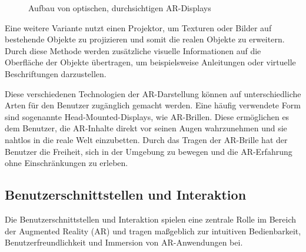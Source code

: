 \begin{figure}[h]
      \centering
      
      \caption[width=0.7\columnwidth]{Aufbau von optischen, durchsichtigen AR-Displays \cite{billinghurst2015survey}}
      \label{fig:OSTAR}
\end{figure}

Eine weitere Variante nutzt einen Projektor, um Texturen oder Bilder auf
bestehende Objekte zu projizieren und somit die realen Objekte zu erweitern.
Durch diese Methode werden zusätzliche visuelle Informationen auf die
Oberfläche der Objekte übertragen, um beispielsweise Anleitungen oder virtuelle
Beschriftungen darzustellen.

Diese verschiedenen Technologien der AR-Darstellung können auf unterschiedliche
Arten für den Benutzer zugänglich gemacht werden. Eine häufig verwendete Form
sind sogenannte Head-Mounted-Displays, wie AR-Brillen. Diese ermöglichen es dem
Benutzer, die AR-Inhalte direkt vor seinen Augen wahrzunehmen und sie nahtlos
in die reale Welt einzubetten. Durch das Tragen der AR-Brille hat der Benutzer
die Freiheit, sich in der Umgebung zu bewegen und die AR-Erfahrung ohne
Einschränkungen zu erleben. \cite{billinghurst2015survey}

\subsection{Benutzerschnittstellen und Interaktion}
Die Benutzerschnittstellen und Interaktion spielen eine zentrale Rolle im
Bereich der Augmented Reality (AR) und tragen maßgeblich zur intuitiven
Bedienbarkeit, Benutzerfreundlichkeit und Immersion von AR-Anwendungen bei.

